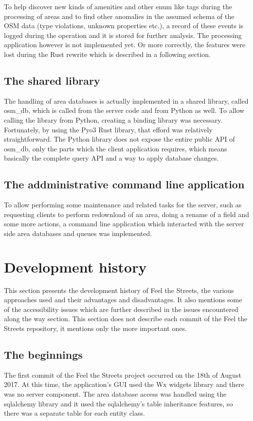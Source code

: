 \documentclass[nolof,digital]{fithesis3}
\begin{document}
To help discover new kinds of amenities and other enum like tags during the processing of areas and to find other anomalies in the assumed schema of the OSM data (type violations, unknown properties etc.), a record of these events is logged during the operation and it is stored for further analysis. The processing application however is not implemented yet. Or more correctly, the features were lost during the Rust rewrite which is described in a following section.
\subsection{The shared library}
The handling of area databases is actually implemented in a shared library, called osm\_db, which is called from the server code and from Python as well. To allow calling the library from Python, creating a binding library was necessary. Fortunately, by using the Pyo3 Rust library, that efford was relatively straightforward. The Python library does not expose the entire public API of osm\_db, only the parts which the client application requires, which means basically the complete query API and a way to apply database changes.
\subsection{The addministrative command line application}
To allow performing some maintenance and related tasks for the server, such as requesting clients to perform redownload of an area, doing a rename of a field and some more actions, a command line application which interacted with the server side area databases and queues was implemented.
\section{Development history}
This section presents the development history of Feel the Streets, the various approaches used and their advantages and disadvantages. It also mentions some of the accessibility issues which are further described in the issues encountered along the way section. This section does not describe each commit of the Feel the Streets repository, it mentions only the more important ones.
\subsection{The beginnings}
The first commit of the Feel the Streets project occurred on the 18th of August 2017. At this time, the application's GUI used the Wx widgets library and there was no server component. The area database access was handled using the sqlalchemy library and it used the sqlalchemy's table inheritance features, so there was a separate table for each entity class.
\end{document}

